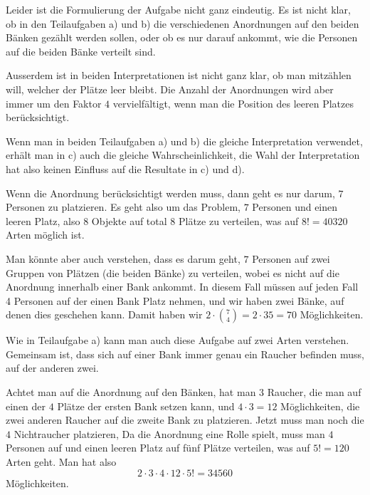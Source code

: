 \begin{loesung}
Leider ist die Formulierung der Aufgabe nicht ganz eindeutig.
Es ist nicht klar, ob in den Teilaufgaben a) und b) die verschiedenen
Anordnungen auf den beiden Bänken gezählt werden sollen, oder ob es
nur darauf ankommt, wie die Personen auf die beiden Bänke verteilt
sind.

Ausserdem ist in beiden Interpretationen ist nicht ganz klar, ob man mitzählen
will, welcher der Plätze leer bleibt.
Die Anzahl der Anordnungen wird aber immer um den Faktor $4$ 
vervielfältigt, wenn man die Position des leeren Platzes berücksichtigt.

Wenn man in beiden Teilaufgaben a) und b) die gleiche Interpretation verwendet,
erhält man in c) auch die gleiche Wahrscheinlichkeit, die Wahl der
Interpretation hat also keinen Einfluss auf die Resultate in c) und d).
\begin{teilaufgaben}
\item
Wenn die Anordnung berücksichtigt werden muss, dann geht es nur
darum, $7$ Personen zu platzieren.
Es geht also um das Problem, $7$ Personen und einen leeren Platz,
also $8$ Objekte auf total $8$ Plätze zu verteilen, was auf 
$8!=40320$ Arten möglich ist.

Man könnte aber auch verstehen, dass es darum geht, $7$ Personen
auf zwei Gruppen von Plätzen (die beiden Bänke) zu verteilen,
wobei es nicht auf die Anordnung innerhalb einer Bank ankommt.
In diesem Fall
müssen auf jeden Fall 4 Personen auf der einen Bank Platz nehmen,
und wir haben zwei Bänke, auf denen dies geschehen kann. 
Damit haben wir $2\cdot\binom{7}{4}=2\cdot 35=70$ Möglichkeiten.

\item
Wie in Teilaufgabe a) kann man auch diese Aufgabe auf zwei Arten verstehen.
Gemeinsam ist, dass sich auf einer Bank immer genau ein Raucher befinden
muss, auf der anderen zwei.

Achtet man auf die Anordnung auf den Bänken,
hat man $3$ Raucher, die man auf einen der $4$ Plätze der ersten Bank setzen
kann, und $4\cdot 3=12$ Möglichkeiten, die zwei anderen Raucher auf die
zweite Bank zu platzieren.
Jetzt muss man noch die $4$ Nichtraucher platzieren,
Da die Anordnung eine Rolle spielt, muss man $4$ Personen auf und
einen leeren Platz auf fünf Plätze verteilen, was auf $5!=120$
Arten geht.
Man hat also
\[
2\cdot 3\cdot 4\cdot 12\cdot 5!=34560
\]
Möglichkeiten.


\end{teilaufgaben}
\end{loesung}
